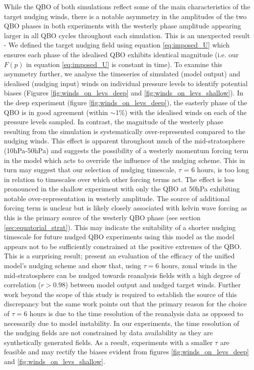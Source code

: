While the QBO of both simulations reflect some of the main characteristics of the target nudging winds, there is a notable asymmetry in the amplitudes of the two QBO phases in both experiments with the westerly phase amplitude appearing larger in all QBO cycles throughout each simulation. This is an unexpected result - We defined the target nudging field using equation \ref{eq:imposed_U} which ensures each phase of the idealised QBO exhibits identical magnitude (i.e. our $F(p)$ in equation \ref{eq:imposed_U} is constant in time). To examine this asymmetry further, we analyse the timeseries of simulated (model output) and idealised (nudging input) winds on individual pressure levels to identify potential biases (Figures \ref{fig:winds_on_levs_deep} and \ref{fig:winds_on_levs_shallow}). In the deep experiment (figure \ref{fig:winds_on_levs_deep}), the easterly phase of the QBO is in good agreement (within $\sim$1\%) with the idealised winds on each of the pressure levels sampled. In contrast, the magnitude of the westerly phase resulting from the simulation is systematically over-represented compared to the nudging winds. This effect is apparent throughout much of the mid-stratosphere (10hPa-50hPa) and suggests the possibility of a westerly momentum forcing term in the model which acts to override the influence of the nudging scheme. This in turn may suggest that our selection of nudging timescale, $\tau$ = 6 hours, is too long in relation to timescales over which other forcing terms  act. The effect is less pronounced in the shallow experiment with only the QBO at 50hPa exhibiting notable over-representation in westerly amplitude. The source of additional forcing term is unclear but is likely closely associated with kelvin wave forcing as this is the primary source of the westerly QBO phase (see section \ref{sec:equatorial_strat}). This may indicate the suitability of a shorter nudging timescale for future nudged QBO experiments using this model as the model appears not to be sufficiently constrained at the positive extremes of the QBO. This is a surprising result; \cite{telfordTechnical2008} present an evaluation of the efficacy of the unified model's nudging scheme and show that, using $\tau = 6$ hours, zonal winds in the mid-stratosphere can be nudged towards reanalysis fields with a high degree of correlation ($r>0.98$) between model output and nudged target winds. Further work beyond the scope of this study is required to establish the source of this discrepancy but the same work points out that the primary reason for the choice of $\tau = 6$ hours is due to the time resolution of the reanalysis data as opposed to necessarily due to model instability. In our experiments, the time resolution of the nudging fields are not constrained by data availability as they are synthetically generated fields. As a result, experiments with a smaller $\tau$ are feasible and may rectify the biases evident from figures \ref{fig:winds_on_levs_deep} and \ref{fig:winds_on_levs_shallow}.

